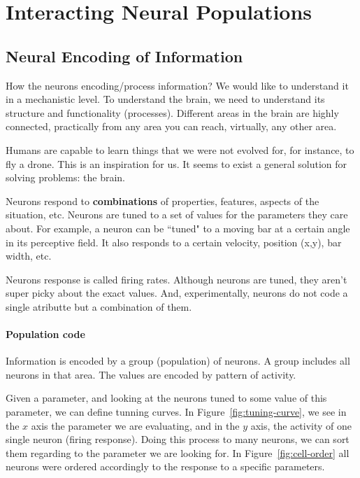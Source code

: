 \documentclass[main]{subfiles}
\begin{document}

\section{Interacting Neural Populations}

\subsection{Neural Encoding of Information}

How the neurons encoding/process information?
We would like to understand it in a mechanistic level.
To understand the brain, we need to understand its structure and functionality (processes).
Different areas in the brain are highly connected, practically from any area you can reach, virtually, any other area.

Humans are capable to learn things that we were not evolved for, for instance, to fly a drone.
This is an inspiration for us.
It seems to exist a general solution for solving problems: the brain.

Neurons respond to \textbf{combinations} of properties, features, aspects of the situation, etc.
Neurons are tuned to a set of values for the parameters they care about.
For example, a neuron can be ``tuned" to a moving bar at a certain angle in its perceptive field. It also responds to a certain velocity, position (x,y), bar width, etc.

Neurons response is called firing rates. Although neurons are tuned, they aren't super picky about the exact values. And, experimentally, neurons do not code a single atributte but a combination of them.

\paragraph{Population code}

Information is encoded by a group (population) of neurons. A group includes all neurons in that area. The values are encoded by pattern of activity.

Given a parameter, and looking at the neurons tuned to some value of this parameter, we can define tunning curves.
In Figure~\ref{fig:tuning-curve}, we see in the $x$ axis the parameter we are evaluating, and in the $y$ axis, the activity of one single neuron (firing response).
Doing this process to many neurons, we can sort them regarding to the parameter we are looking for.
In Figure~\ref{fig:cell-order} all neurons were ordered accordingly to the response to a specific parameters.
\end{document}
